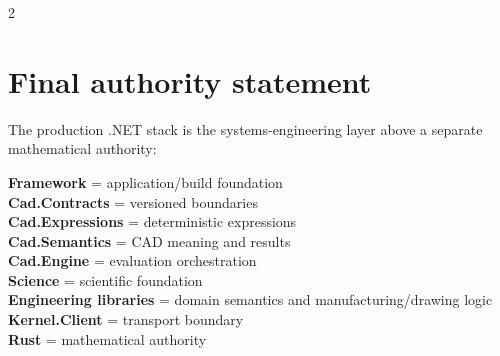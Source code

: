 \documentclass[10pt,a4paper]{article}
\begin{document}
\begin{multicols}{2}
\section{Final authority statement}
The production .NET stack is the systems-engineering layer above a separate mathematical authority:
\begin{center}
\begin{tcolorbox}[colback=panel,colframe=navy!25,boxrule=0.5pt,arc=2mm,width=0.97\columnwidth,left=5pt,right=5pt,top=4pt,bottom=4pt]
\centering\small
\textbf{Framework} = application/build foundation\\
\textbf{Cad.Contracts} = versioned boundaries\\
\textbf{Cad.Expressions} = deterministic expressions\\
\textbf{Cad.Semantics} = CAD meaning and results\\
\textbf{Cad.Engine} = evaluation orchestration\\
\textbf{Science} = scientific foundation\\
\textbf{Engineering libraries} = domain semantics and manufacturing/drawing logic\\
\textbf{Kernel.Client} = transport boundary\\[2pt]
\textbf{Rust} = mathematical authority
\end{tcolorbox}
\end{center}

\end{multicols}
\end{document}
